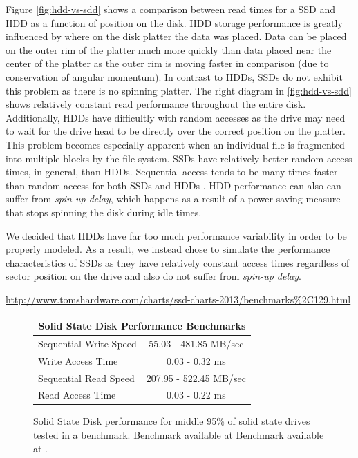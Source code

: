 \documentclass[10pt,letter]{article}
\begin{document}
Figure \ref{fig:hdd-vs-sdd} shows a comparison between read times for a SSD and HDD as a function of position on the disk. HDD storage performance is greatly influenced by where on the disk platter the data was placed. Data can be placed on the outer rim of the platter much more quickly than data placed near the center of the platter as the outer rim is moving faster in comparison (due to conservation of angular momentum). In contrast to HDDs, SSDs do not exhibit this problem as there is no spinning platter. The right diagram in \ref{fig:hdd-vs-sdd} shows relatively constant read performance throughout the entire disk. Additionally, HDDs have difficultly with random accesses as the drive may need to wait for the drive head to be directly over the correct position on the platter. This problem becomes especially apparent when an individual file is fragmented into multiple blocks by the file system. SSDs have relatively better random access times, in general, than HDDs. Sequential access tends to be many times faster than random access for both SSDs and HDDs \cite{disk-perf}. HDD performance can also can suffer from {\em spin-up delay}, which happens as a result of a power-saving measure that stops spinning the disk during idle times.

We decided that HDDs have far too much performance variability in order to be properly modeled. As a result, we instead chose to simulate the performance characteristics of SSDs as they have relatively constant access times regardless of sector position on the drive and also do not suffer from {\em spin-up delay}.

\urldef\hwbenchmark\url{http://www.tomshardware.com/charts/ssd-charts-2013/benchmarks%2C129.html}
\begin{figure}
\centering
\begin{tabular}{l || c}
\multicolumn{2}{c}{{\bf Solid State Disk Performance Benchmarks}} \\ \hline
Sequential Write Speed  \hspace{7em} & 55.03 - 481.85 MB/sec \\ 
Write Access Time & 0.03 - 0.32 ms \\ \hline
Sequential Read Speed &  207.95 - 522.45 MB/sec \\
Read Access Time & 0.03 - 0.22 ms \\ \hline
\end{tabular}
\caption[Solid State Performance]{Solid State Disk performance for middle 95\% of solid state drives tested in a benchmark. Benchmark available at Benchmark available at \hwbenchmark.}
\label{fig:sdd-perf}
\end{figure}
\end{document}
